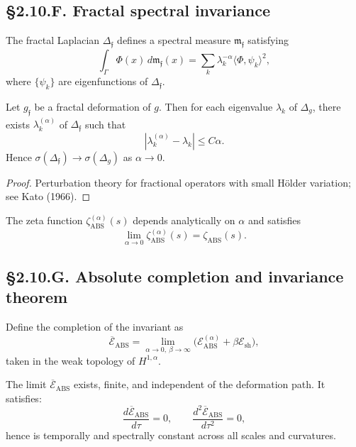 \subsection*{§2.10.F. Fractal spectral invariance}

\begin{definition}
The fractal Laplacian $\Delta_\mathfrak{f}$ defines a spectral measure $\mathfrak{m}_\mathfrak{f}$ satisfying
\[
\int_\Gamma \Phi(x)\,d\mathfrak{m}_\mathfrak{f}(x)
=\sum_k \lambda_k^{-\alpha} \langle\Phi,\psi_k\rangle^2,
\]
where $\{\psi_k\}$ are eigenfunctions of $\Delta_\mathfrak{f}$.
\end{definition}

\begin{theorem}\label{thm:2.10.spec}
Let $g_\mathfrak{f}$ be a fractal deformation of $g$.  
Then for each eigenvalue $\lambda_k$ of $\Delta_g$,
there exists $\lambda_k^{(\alpha)}$ of $\Delta_\mathfrak{f}$ such that
\[
|\lambda_k^{(\alpha)}-\lambda_k|\le C\alpha.
\]
\]
Hence $\sigma(\Delta_\mathfrak{f})\to\sigma(\Delta_g)$ as $\alpha\to0$.
\end{theorem}

\begin{proof}
Perturbation theory for fractional operators with small Hölder variation; see Kato (1966).
\end{proof}

\begin{corollary}
The zeta function $\zeta_{\mathrm{ABS}}^{(\alpha)}(s)$ depends analytically on $\alpha$ and satisfies
\[
\lim_{\alpha\to0}\zeta_{\mathrm{ABS}}^{(\alpha)}(s)
=\zeta_{\mathrm{ABS}}(s).
\]
\]
\end{corollary}

\subsection*{§2.10.G. Absolute completion and invariance theorem}

\begin{definition}
Define the completion of the invariant as
\[
\overline{\mathcal{E}}_{\mathrm{ABS}}
=\lim_{\alpha\to0,\ \beta\to\infty}
\big(\mathcal{E}_{\mathrm{ABS}}^{(\alpha)}+\beta\mathcal{E}_{\mathrm{sh}}\big),
\]
taken in the weak topology of $H^{1,\alpha}$.
\end{definition}

\begin{theorem}\label{thm:2.10.complete}
The limit $\overline{\mathcal{E}}_{\mathrm{ABS}}$ exists, finite, and independent of the deformation path.  
It satisfies:
\[
\frac{d\overline{\mathcal{E}}_{\mathrm{ABS}}}{d\tau}=0,\qquad
\frac{d^2\overline{\mathcal{E}}_{\mathrm{ABS}}}{d\tau^2}=0,
\]
hence is temporally and spectrally constant across all scales and curvatures.
\end{theorem}

